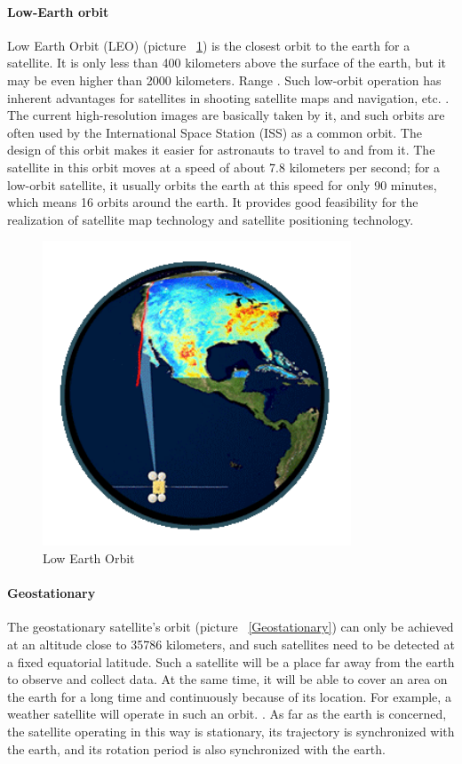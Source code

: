 \documentclass[conference]{IEEEtran}
\begin{document}
\paragraph{Low-Earth orbit}

Low Earth Orbit (LEO) (picture ~\ref{LEO}) is the closest orbit to the earth for a satellite. It is only less than 400 kilometers above the surface of the earth, but it may be even higher than 2000 kilometers. Range \cite{WhatisRe36:online}. Such low-orbit operation has inherent advantages for satellites in shooting satellite maps and navigation, etc. \cite{earthdata28:online}. The current high-resolution images are basically taken by it, and such orbits are often used by the International Space Station (ISS) as a common orbit. The design of this orbit makes it easier for astronauts to travel to and from it. The satellite in this orbit moves at a speed of about 7.8 kilometers per second; for a low-orbit satellite, it usually orbits the earth at this speed for only 90 minutes, which means 16 orbits around the earth. It provides good feasibility for the realization of satellite map technology and satellite positioning technology\cite{ESAkerne12:online}.

\begin{figure}[htbp]
    \centerline{\includegraphics[width=260pt]{images/1.1.2.png}}
    \caption{Low Earth Orbit}
    \label{LEO}
\end{figure}


\paragraph{Geostationary}
The geostationary satellite's orbit (picture ~\ref{Geostationary}) can only be achieved at an altitude close to 35786 kilometers, and such satellites need to be detected at a fixed equatorial latitude\cite{Synchron89:online}. Such a satellite will be a place far away from the earth to observe and collect data. At the same time, it will be able to cover an area on the earth for a long time and continuously because of its location. For example, a weather satellite will operate in such an orbit. \Cite{WhatisRe36:online}. As far as the earth is concerned, the satellite operating in this way is stationary, its trajectory is synchronized with the earth, and its rotation period is also synchronized with the earth\cite{CelesTra70:online}.
\end{document}
